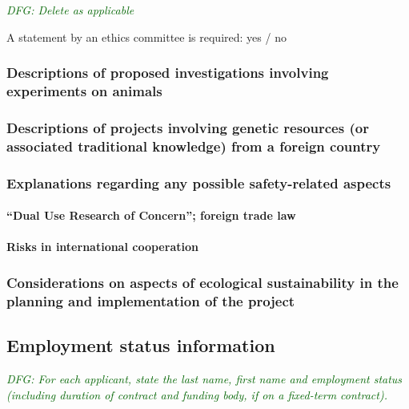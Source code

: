 \documentclass[a4paper,11pt]{amsart}
\theoremstyle{definition}
\newcommand{\<}{\langle}
\renewcommand{\>}{\rangle}
\newcommand{\dfg}[1]{\emph{\textcolor{darkgreen}{DFG: #1}}}
\begin{document}
\dfg{Delete as applicable}

A statement by an ethics committee is required: yes / no

\subsubsection{Descriptions of proposed investigations involving experiments on animals}

\subsubsection{Descriptions of projects involving genetic resources (or associated traditional knowledge) from a foreign country}

\subsubsection{Explanations regarding any possible safety-related aspects}

\paragraph{\texorpdfstring{``Dual Use Research of Concern''}{\textquotedblleft Dual Use Research of Concern\textquotedblright}; foreign trade law}

\paragraph{Risks in international cooperation}

\subsubsection{Considerations on aspects of ecological sustainability in the planning and implementation of the project}

\subsection{Employment status information}
\dfg{For each applicant, state the last name, first name and
  employment status (including duration of contract and funding body,
  if on a fixed-term contract).}
\end{document}
